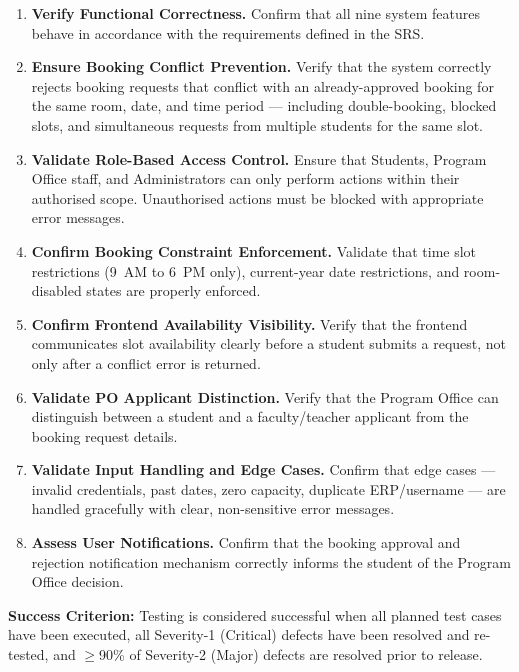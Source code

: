 \documentclass[12pt, a4paper]{article}
\begin{document}
\begin{enumerate}[leftmargin=1.5em]

  \item \textbf{Verify Functional Correctness.}
  Confirm that all nine system features behave in accordance with the requirements defined in the SRS.

  \item \textbf{Ensure Booking Conflict Prevention.}
  Verify that the system correctly rejects booking requests that conflict with an already-approved booking for the same room, date, and time period --- including double-booking, blocked slots, and simultaneous requests from multiple students for the same slot.

  \item \textbf{Validate Role-Based Access Control.}
  Ensure that Students, Program Office staff, and Administrators can only perform actions within their authorised scope. Unauthorised actions must be blocked with appropriate error messages.

  \item \textbf{Confirm Booking Constraint Enforcement.}
  Validate that time slot restrictions (9~AM to 6~PM only), current-year date restrictions, and room-disabled states are properly enforced.

  \item \textbf{Confirm Frontend Availability Visibility.}
  Verify that the frontend communicates slot availability clearly before a student submits a request, not only after a conflict error is returned.

  \item \textbf{Validate PO Applicant Distinction.}
  Verify that the Program Office can distinguish between a student and a faculty/teacher applicant from the booking request details.

  \item \textbf{Validate Input Handling and Edge Cases.}
  Confirm that edge cases --- invalid credentials, past dates, zero capacity, duplicate ERP/username --- are handled gracefully with clear, non-sensitive error messages.

  \item \textbf{Assess User Notifications.}
  Confirm that the booking approval and rejection notification mechanism correctly informs the student of the Program Office decision.

\end{enumerate}

\begin{infobox}
\textbf{Success Criterion:} Testing is considered successful when all planned test cases have been executed, all Severity-1 (Critical) defects have been resolved and re-tested, and $\geq$90\% of Severity-2 (Major) defects are resolved prior to release.
\end{infobox}
\end{document}
